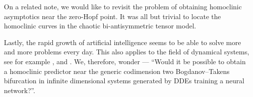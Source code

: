 On a related note, we would like to revisit the problem of obtaining homoclinic
asymptotics near the zero-Hopf point. It was all but trivial to locate the
homoclinic curves in the chaotic bi-antisymmetric tensor model.

Lastly, the rapid growth of artificial intelligence seems to be able to solve
more and more problems every day. This also applies to the field of dynamical
systems, see for example \cite{Ghadami2022}, and
\cite{631606893d774be2a2c919789d14b2d6}. We, therefore, wonder --- ``Would it be
possible to obtain a homoclinic predictor near the generic codimension two
Bogdanov--Takens bifurcation in infinite dimensional systems generated by DDEs
training a neural network?''.

